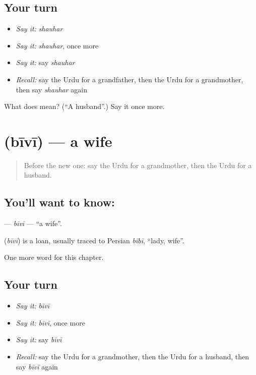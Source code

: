 \subsection*{Your turn}
\begin{itemize}
\raggedright
  \item \emph{Say it:} \emph{shauhar}
  \item \emph{Say it:} \emph{shauhar}, once more
  \item \emph{Say it:} say \emph{shauhar}
  \item \emph{Recall:} say the Urdu for a grandfather, then the Urdu for a grandmother, then say \emph{shauhar} again
\end{itemize}

\begin{tcolorbox}[breakable,colback=teal!4,colframe=teal!35!black,title={Before you move on}]
What does  mean? (\textquotedblleft{}A husband\textquotedblright{}.) Say it once more.
\end{tcolorbox}
\section[\texorpdfstring{\ur{بیوی} (bīvī)}{بیوی (bīvī)}]{ (bīvī) — a wife}

\label{lesson:UR-C44-bivi}



\begin{quote}
Before the new one: say the Urdu for a grandmother, then the Urdu for a husband.
\end{quote}

\subsection*{You'll want to know: }
\textbf{} — \emph{bīvī} — \textquotedblleft{}a wife\textquotedblright{}.

\begin{cousinweb}
\textbf{} (\emph{bīvī}) is a loan, usually traced to Persian \emph{bībī}, \textquotedblleft{}lady, wife\textquotedblright{}.
\end{cousinweb}

\begin{grammarlens}[title={What you've built}]
One more word for this chapter.
\end{grammarlens}

\subsection*{Your turn}
\begin{itemize}
\raggedright
  \item \emph{Say it:} \emph{bīvī}
  \item \emph{Say it:} \emph{bīvī}, once more
  \item \emph{Say it:} say \emph{bīvī}
  \item \emph{Recall:} say the Urdu for a grandmother, then the Urdu for a husband, then say \emph{bīvī} again
\end{itemize}


